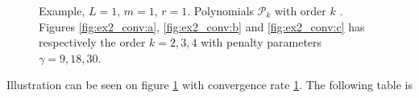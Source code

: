 \begin{figure}
    \caption{ Example, $L=1$, $m=1$, $r=1$. Polynomials $\mathcal{P}_{k} $ with order $k$ . Figures \ref{fig:ex2_conv:a}, \ref{fig:ex2_conv:b} and \ref{fig:ex2_conv:c} has respectively the order $k=2,3, 4$ with penalty parameters $\gamma = 9,18,30 $.  }
    \label{fig:ex2_conv}
\end{figure}

Illustration can be seen on figure \ref{fig:ex2_conv} with convergence rate \ref{fig:ex2_conv}. The following table is









